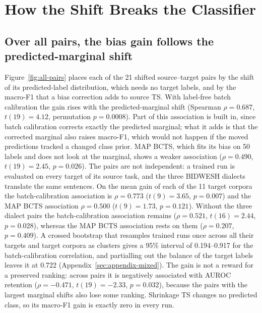 \section{How the Shift Breaks the Classifier}
\label{sec:results-diagnosis}

\subsection{Over all pairs, the bias gain follows the predicted-marginal shift}
\label{sec:results-all-pairs}

Figure~\ref{fig:all-pairs} places each of the 21 shifted source--target pairs by the shift of its predicted-label
distribution, which needs no target labels, and by the macro-F1 that a bias correction adds to source TS. With
label-free batch calibration the gain rises with the predicted-marginal shift (Spearman $\rho = 0.687$,
$t(19) = 4.12$, permutation $p = 0.0008$). Part of this association is built in, since batch calibration corrects
exactly the predicted marginal; what it adds is that the corrected marginal also raises macro-F1, which would not
happen if the moved predictions tracked a changed class prior. MAP BCTS, which fits its bias on 50 labels and does
not look at the marginal, shows a weaker association ($\rho = 0.490$, $t(19) = 2.45$, $p = 0.026$). The pairs are not
independent: a trained run is evaluated on every target of its source task, and the three BIDWESH dialects translate
the same sentences. On the mean gain of each of the 11 target corpora the batch-calibration association is
$\rho = 0.773$ ($t(9) = 3.65$, $p = 0.007$) and the MAP BCTS association $\rho = 0.500$ ($t(9) = 1.73$, $p = 0.121$).
Without the three dialect pairs the batch-calibration association remains ($\rho = 0.521$, $t(16) = 2.44$,
$p = 0.028$), whereas the MAP BCTS association rests on them ($\rho = 0.207$, $p = 0.409$). A crossed bootstrap
that resamples trained runs once across all their targets and target corpora as clusters gives a 95\% interval of
0.194--0.917 for the batch-calibration correlation, and partialling out the balance of the target labels leaves it at
0.722 (Appendix~\ref{sec:appendix-mixed}). The gain is not a reward for a preserved ranking: across pairs
it is negatively associated with AUROC retention ($\rho = -0.471$, $t(19) = -2.33$, $p = 0.032$), because the pairs
with the largest marginal shifts also lose some ranking. Shrinkage TS changes no predicted class, so its macro-F1 gain
is exactly zero in every run.

